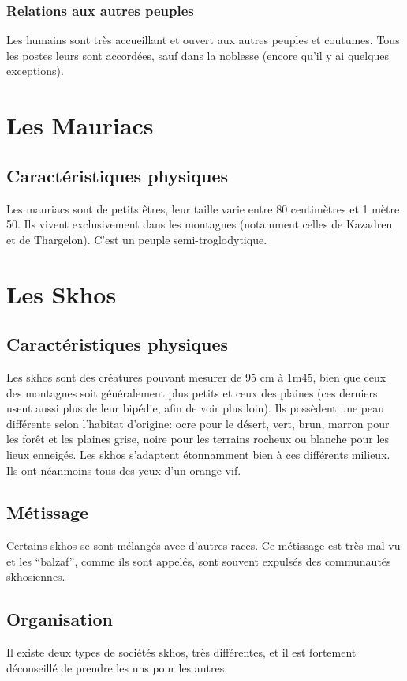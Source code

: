 \subsubsection{Relations aux autres peuples}
Les humains sont très accueillant et ouvert aux autres peuples et coutumes. Tous les postes leurs sont accordées, sauf dans la noblesse (encore qu’il y ai quelques exceptions). 

\section{Les Mauriacs}
\subsection{Caractéristiques physiques}
Les mauriacs sont de petits êtres, leur taille varie entre 80 centimètres et 1 mètre 50. Ils vivent exclusivement dans les montagnes (notamment celles de Kazadren et de Thargelon). C'est un peuple semi-troglodytique.

\section{Les Skhos}
\subsection{Caractéristiques physiques}
Les skhos sont des créatures pouvant mesurer de 95 cm à 1m45, bien que ceux des montagnes soit généralement plus petits et ceux des plaines (ces derniers usent aussi plus de leur bipédie, afin de voir plus loin). Ils possèdent une peau différente selon l’habitat d’origine: ocre pour le désert, vert, brun, marron pour les forêt et les plaines grise, noire pour les terrains rocheux ou blanche pour les lieux enneigés. Les skhos s'adaptent étonnamment bien à ces différents milieux. Ils ont néanmoins tous des yeux d'un orange vif.
\subsection{Métissage}
Certains skhos se sont mélangés avec d'autres races. Ce métissage est très mal vu et les “balzaf”, comme ils sont appelés, sont souvent expulsés des communautés skhosiennes.
\subsection{Organisation}
Il existe deux types de sociétés skhos, très différentes, et il est fortement déconseillé de prendre les uns pour les autres.
